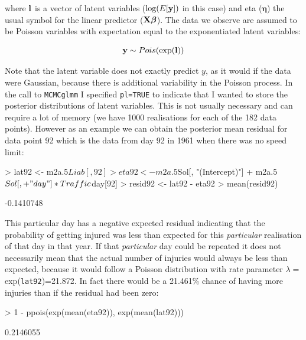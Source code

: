 \documentclass{article}
\begin{document}
where ${\bf l}$ is a vector of latent variables ($\textrm{log}(E[{\bf y}])$ in this case) and eta (${\bm \eta}$) the usual symbol for the linear predictor (${\bf X}{\bm \beta}$). The data we observe are assumed to be Poisson variables with expectation equal to the exponentiated latent variables: 

\begin{equation}
{\bf y} \sim Pois(\textrm{exp}({\bf l}))
\end{equation}


Note that the latent variable does not exactly predict $y$, as it would if the data were Gaussian, because there is additional variability in the Poisson process. In the call to \texttt{MCMCglmm} I specified \texttt{pl=TRUE} to indicate that I wanted to store the posterior distributions of latent variables. This is not usually necessary and can require a lot of memory (we have 1000 realisations for each of the 182 data points). However as an example we can obtain the posterior mean residual for data point 92 which is the data from day 92 in 1961 when there was no speed limit:

\begin{Schunk}
\begin{Sinput}
> lat92 <- m2a.5$Liab[, 92]
> eta92 <- m2a.5$Sol[, "(Intercept)"] + m2a.5$Sol[, 
+     "day"] * Traffic$day[92]
> resid92 <- lat92 - eta92
> mean(resid92)
\end{Sinput}
\begin{Soutput}
[1] -0.1410748
\end{Soutput}
\end{Schunk}

This particular day has a negative expected residual indicating that the probability of getting injured was less than expected for this \emph{particular} realisation of that day in that year. If that \emph{particular} day could be repeated it does not necessarily mean that the actual number of injuries would always be less than expected, because it would follow a Poisson distribution with rate parameter $\lambda=$exp(\texttt{lat92})=21.872. In fact there would be a 21.461\% chance of having more injuries than if the residual had been zero:

\begin{Schunk}
\begin{Sinput}
> 1 - ppois(exp(mean(eta92)), exp(mean(lat92)))
\end{Sinput}
\begin{Soutput}
[1] 0.2146055
\end{Soutput}
\end{Schunk}
\end{document}
